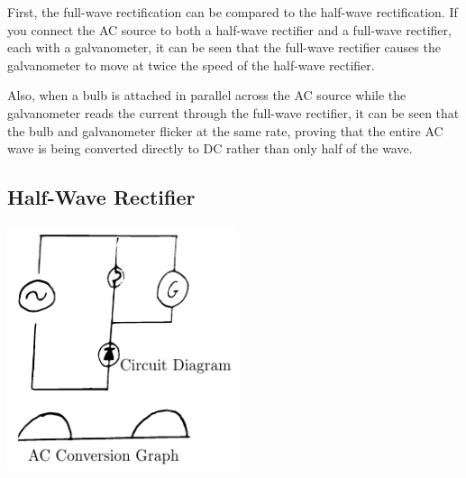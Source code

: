 \begin{multicols}{2}
\begin{description*}
{First, the full-wave rectification can be compared to the half-wave rectification.  If you connect the AC source to both a half-wave rectifier and a full-wave rectifier, each with a galvanometer, it can be seen that the full-wave rectifier causes the galvanometer to move at twice the speed of the half-wave rectifier.

Also, when a bulb is attached in parallel across the AC source while the galvanometer reads the current through the full-wave rectifier, it can be seen that the bulb and galvanometer flicker at the same rate, proving that the entire AC wave is being converted directly to DC rather than only half of the wave.}
\end{description*}

\subsection{Half-Wave Rectifier}

\begin{center}
\includegraphics[width=0.5\textwidth]{./img/half-wave-rectifier-2.png}
\end{center}


\end{multicols}
